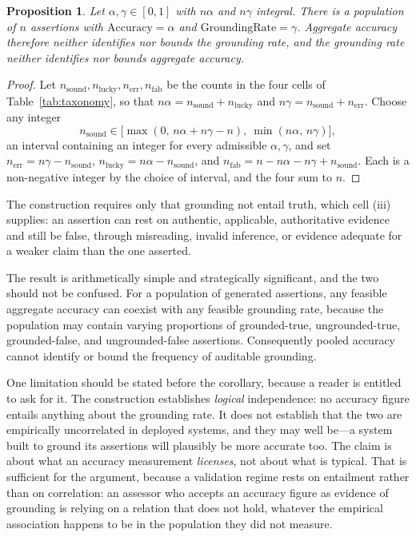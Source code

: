 \documentclass[11pt]{article}
\theoremstyle{plain}
\newtheorem{proposition}{Proposition}
\theoremstyle{definition}
\begin{document}
\begin{proposition}
\label{prop:independence}
Let $\alpha, \gamma \in [0,1]$ with $n\alpha$ and $n\gamma$ integral. There is a
population of $n$ assertions with $\mathrm{Accuracy} = \alpha$ and
$\mathrm{GroundingRate} = \gamma$. Aggregate accuracy therefore neither identifies
nor bounds the grounding rate, and the grounding rate neither identifies nor bounds
aggregate accuracy.
\end{proposition}

\begin{proof}
Let $n_{\mathrm{sound}}, n_{\mathrm{lucky}}, n_{\mathrm{err}}, n_{\mathrm{fab}}$
be the counts in the four cells of Table~\ref{tab:taxonomy}, so that
$n\alpha = n_{\mathrm{sound}} + n_{\mathrm{lucky}}$ and
$n\gamma = n_{\mathrm{sound}} + n_{\mathrm{err}}$. Choose any integer
\[
  n_{\mathrm{sound}} \in
  \bigl[\max(0,\, n\alpha + n\gamma - n),\ \min(n\alpha,\, n\gamma)\bigr],
\]
an interval containing an integer for every admissible $\alpha, \gamma$, and set
$n_{\mathrm{err}} = n\gamma - n_{\mathrm{sound}}$,
$n_{\mathrm{lucky}} = n\alpha - n_{\mathrm{sound}}$, and
$n_{\mathrm{fab}} = n - n\alpha - n\gamma + n_{\mathrm{sound}}$. Each is a
non-negative integer by the choice of interval, and the four sum to $n$.
\end{proof}

The construction requires only that grounding not entail truth, which cell (iii)
supplies: an assertion can rest on authentic, applicable, authoritative evidence
and still be false, through misreading, invalid inference, or evidence adequate for
a weaker claim than the one asserted.

The result is arithmetically simple and strategically significant, and the two
should not be confused. For a population of generated assertions, any feasible
aggregate accuracy can coexist with any feasible grounding rate, because the
population may contain varying proportions of grounded-true, ungrounded-true,
grounded-false, and ungrounded-false assertions. Consequently pooled accuracy
cannot identify or bound the frequency of auditable grounding.

One limitation should be stated before the corollary, because a reader is entitled to
ask for it. The construction establishes \emph{logical} independence: no accuracy
figure entails anything about the grounding rate. It does not establish that the two
are empirically uncorrelated in deployed systems, and they may well be---a system
built to ground its assertions will plausibly be more accurate too. The claim is about
what an accuracy measurement \emph{licenses}, not about what is typical. That is
sufficient for the argument, because a validation regime rests on entailment rather
than on correlation: an assessor who accepts an accuracy figure as evidence of
grounding is relying on a relation that does not hold, whatever the empirical
association happens to be in the population they did not measure.
\end{document}
